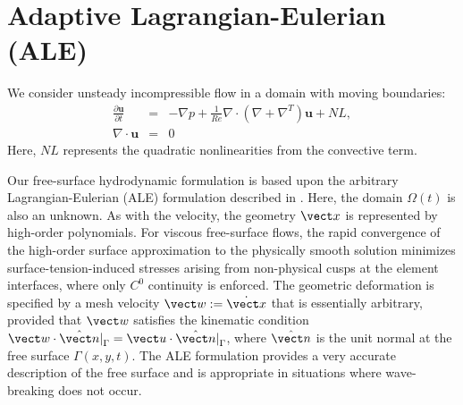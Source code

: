 
\section{Adaptive Lagrangian-Eulerian (ALE)}

We consider unsteady incompressible flow in a domain with moving boundaries:
\begin{eqnarray} \label{eq:mhd1}
\frac{\partial\mathbf u}{\partial t}&=&-\nabla p +\frac{1}{Re}\nabla\cdot(\nabla + \nabla^T)\mathbf u  + NL,\\
 \nabla \cdot \mathbf u &= &0 
\end{eqnarray}
Here, \(NL\) represents the quadratic nonlinearities from the convective term.

Our free-surface hydrodynamic formulation is based upon the arbitrary 
Lagrangian-Eulerian (ALE) formulation described in \cite{ho89}.
Here, the domain \(\Omega(t)\) is also an unknown.  As with the velocity,
the geometry \(\vect x\) is represented by high-order polynomials.
For viscous free-surface flows,
the rapid convergence of the high-order surface approximation to the 
physically smooth solution minimizes surface-tension-induced stresses
arising from non-physical cusps at the element interfaces, 
where only \(C^0\) continuity is enforced.  
The geometric deformation is specified by a mesh velocity \(\vect w := \dot{\vect x}\)
that is essentially arbitrary, provided that \(\vect w\) satisfies the kinematic
condition \(\vect w \cdot \hat{\vect n}|^{}_{\Gamma} = \vect u \cdot \hat{\vect n}|^{}_{\Gamma}\),
where \(\hat{\vect n}\) is the unit normal at the free surface \(\Gamma(x,y,t)\).
The ALE formulation provides a very accurate description of the free
surface and is appropriate in situations where wave-breaking does not occur.

